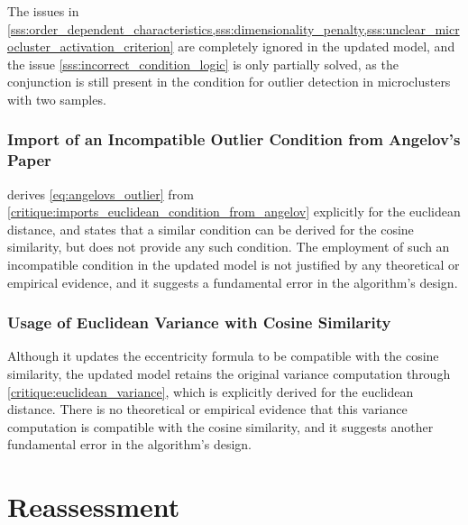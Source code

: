 \documentclass[a4paper]{article}
\begin{document}
The issues in \cref{sss:order_dependent_characteristics,sss:dimensionality_penalty,sss:unclear_microcluster_activation_criterion} are completely ignored in the updated model, and the issue \ref{sss:incorrect_condition_logic} is only partially solved, as the conjunction is still present in the condition for outlier detection in microclusters with two samples.

\subsubsection{Import of an Incompatible Outlier Condition from Angelov's Paper}

\cite{angelov2014anomaly} derives \cref{eq:angelovs_outlier} from \cref{critique:imports_euclidean_condition_from_angelov} explicitly for the euclidean distance, and states that a similar condition can be derived for the cosine similarity, but does not provide any such condition. The employment of such an incompatible condition in the updated model is not justified by any theoretical or empirical evidence, and it suggests a fundamental error in the algorithm's design.

\subsubsection{Usage of Euclidean Variance with Cosine Similarity}

Although it updates the eccentricity formula to be compatible with the cosine similarity, the updated model retains the original variance computation through \cref{critique:euclidean_variance}, which is explicitly derived for the euclidean distance. There is no theoretical or empirical evidence that this variance computation is compatible with the cosine similarity, and it suggests another fundamental error in the algorithm's design.

\section{Reassessment}

\end{document}
